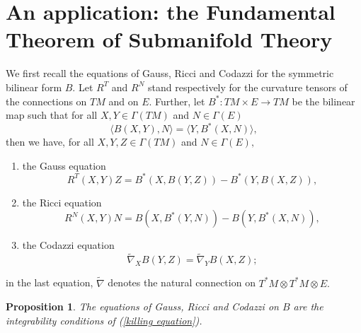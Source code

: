 \documentclass{amsart}
\newtheorem{prop}[lem]{Proposition}
\begin{document}
\section{An application: the Fundamental Theorem of Submanifold Theory}\label{section fundamental theorem}
 We first recall the equations of Gauss, Ricci and Codazzi for the symmetric bilinear form $B$. Let $R^T$ and $R^N$ stand respectively for the curvature tensors of the connections on $TM$ and on $E$. Further, let $B^*:TM\times E\rightarrow TM$ be the bilinear map such that for all $X,Y\in\Gamma(TM)$ and $N\in\Gamma(E)$
$$\langle B(X,Y),N\rangle =\langle Y,B^*(X,N)\rangle,$$
then we have, for all $X,Y,Z\in\Gamma(TM)$ and $N\in\Gamma(E),$
\begin{enumerate}
\item the Gauss equation
$$R^T(X,Y)Z=B^*(X,B(Y,Z))-B^*(Y,B(X,Z)),$$
\item the Ricci equation
$$R^N(X,Y)N=B(X,B^*(Y,N))-B(Y,B^*(X,N)),$$
\item the Codazzi equation
$$\tilde{\nabla}_X B(Y,Z)=\tilde{\nabla}_Y B(X,Z);$$
\end{enumerate}
in the last equation, $\tilde{\nabla}$ denotes the natural connection on $T^*M\otimes T^*M\otimes E.$ 
\begin{prop}\label{GRC_as_int_conditions}
The equations of Gauss, Ricci and Codazzi on $B$ are the integrability conditions of (\ref{killing equation}).
\end{prop}
\end{document}
